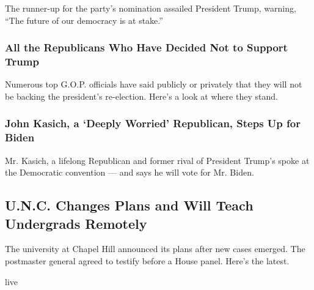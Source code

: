The runner-up for the party's nomination assailed President Trump,
warning, ``The future of our democracy is at stake.''

\href{https://www.nytimes.com/article/republicans-voting-for-biden-not-trump.html}{}

\hypertarget{all-the-republicans-who-have-decided-not-to-support-trump}{%
\subsubsection{All the Republicans Who Have Decided Not to Support
Trump}\label{all-the-republicans-who-have-decided-not-to-support-trump}}

\href{https://www.nytimes.com/article/republicans-voting-for-biden-not-trump.html}{}

Numerous top G.O.P. officials have said publicly or privately that they
will not be backing the president's re-election. Here's a look at where
they stand.

\href{https://www.nytimes.com/2020/08/17/us/politics/john-kasich-biden.html}{}

\hypertarget{john-kasich-a-deeply-worried-republican-steps-up-for-biden}{%
\subsubsection{John Kasich, a `Deeply Worried' Republican, Steps Up for
Biden}\label{john-kasich-a-deeply-worried-republican-steps-up-for-biden}}

\href{https://www.nytimes.com/2020/08/17/us/politics/john-kasich-biden.html}{}

Mr. Kasich, a lifelong Republican and former rival of President Trump's
spoke at the Democratic convention --- and says he will vote for Mr.
Biden.

\href{/2020/08/17/world/coronavirus-covid.html}{}

\hypertarget{unc-changes-plans-and-will-teach-undergrads-remotely}{%
\subsection{U.N.C. Changes Plans and Will Teach Undergrads
Remotely}\label{unc-changes-plans-and-will-teach-undergrads-remotely}}

The university at Chapel Hill announced its plans after new cases
emerged. The postmaster general agreed to testify before a House panel.
Here's the latest.

live

